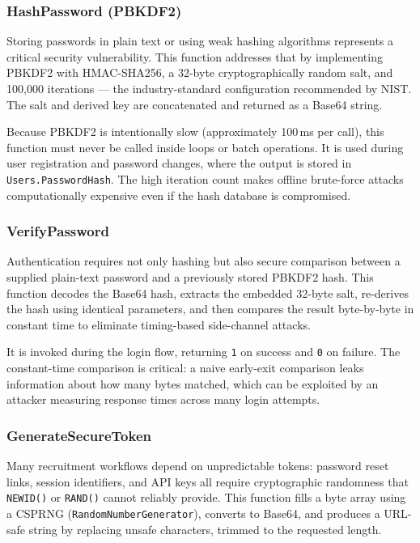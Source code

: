 \documentclass[11pt,a4paper]{article}
\begin{document}
\subsubsection{HashPassword (PBKDF2)}
\noindent
Storing passwords in plain text or using weak hashing algorithms represents a critical security vulnerability. This function addresses that by implementing PBKDF2 with HMAC-SHA256, a 32-byte cryptographically random salt, and 100{,}000 iterations --- the industry-standard configuration recommended by NIST. The salt and derived key are concatenated and returned as a Base64 string.

Because PBKDF2 is intentionally slow (approximately 100\,ms per call), this function must never be called inside loops or batch operations. It is used during user registration and password changes, where the output is stored in \texttt{Users.PasswordHash}. The high iteration count makes offline brute-force attacks computationally expensive even if the hash database is compromised.

\subsubsection{VerifyPassword}
\noindent
Authentication requires not only hashing but also secure comparison between a supplied plain-text password and a previously stored PBKDF2 hash. This function decodes the Base64 hash, extracts the embedded 32-byte salt, re-derives the hash using identical parameters, and then compares the result byte-by-byte in constant time to eliminate timing-based side-channel attacks.

It is invoked during the login flow, returning \texttt{1} on success and \texttt{0} on failure. The constant-time comparison is critical: a naive early-exit comparison leaks information about how many bytes matched, which can be exploited by an attacker measuring response times across many login attempts.

\subsubsection{GenerateSecureToken}
\noindent
Many recruitment workflows depend on unpredictable tokens: password reset links, session identifiers, and API keys all require cryptographic randomness that \texttt{NEWID()} or \texttt{RAND()} cannot reliably provide. This function fills a byte array using a CSPRNG (\texttt{RandomNumberGenerator}), converts to Base64, and produces a URL-safe string by replacing unsafe characters, trimmed to the requested length.
\end{document}
